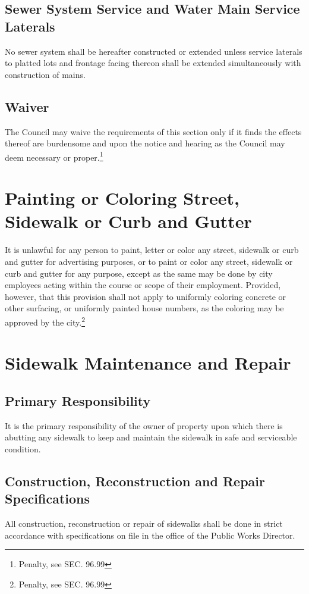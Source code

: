 \subsection{Sewer System Service and Water Main Service Laterals}
No sewer system shall be hereafter constructed or extended unless service laterals to platted lots and frontage facing thereon shall be extended simultaneously with construction of mains.
\subsection{Waiver}
The Council may waive the requirements of this section only if it finds the effects thereof are burdensome and upon the notice and hearing as the Council may deem necessary or proper.\footnote{Penalty, see SEC. 96.99}

\section{Painting or Coloring Street, Sidewalk or Curb and Gutter}
It is unlawful for any person to paint, letter or color any street, sidewalk or curb and gutter for advertising purposes, or to paint or color any street, sidewalk or curb and gutter for any purpose, except as the same may be done by city employees acting within the course or scope of their employment. Provided, however, that this provision shall not apply to uniformly coloring concrete or other surfacing, or uniformly painted house numbers, as the coloring may be approved by the city.\footnote{Penalty, see SEC. 96.99}

\section{Sidewalk Maintenance and Repair}
\subsection{Primary Responsibility}
It is the primary responsibility of the owner of property upon which there is abutting any sidewalk to keep and maintain the sidewalk in safe and serviceable condition.
\subsection{Construction, Reconstruction and Repair Specifications}
All construction, reconstruction or repair of sidewalks shall be done in strict accordance with specifications on file in the office of the Public Works Director.

